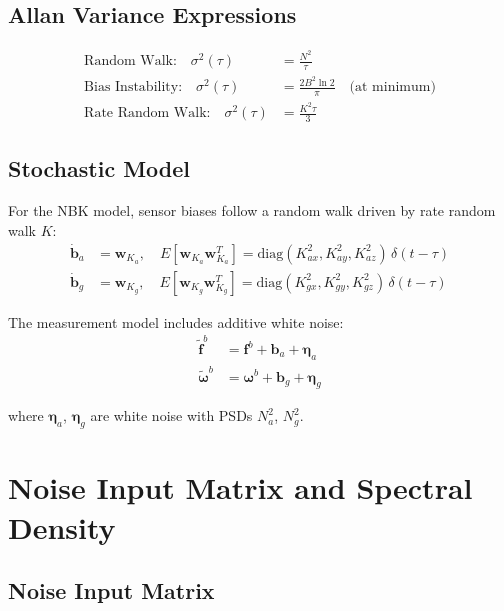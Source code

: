 \documentclass[11pt,a4paper]{article}
\newcommand{\mat}[1]{\mathbf{#1}}
\newcommand{\vect}[1]{\boldsymbol{#1}}
\begin{document}
\subsection{Allan Variance Expressions}

\begin{align}
    \text{Random Walk:} \quad \sigma^2(\tau) &= \frac{N^2}{\tau} \\
    \text{Bias Instability:} \quad \sigma^2(\tau) &= \frac{2B^2 \ln 2}{\pi} \quad \text{(at minimum)} \\
    \text{Rate Random Walk:} \quad \sigma^2(\tau) &= \frac{K^2 \tau}{3}
\end{align}

\subsection{Stochastic Model}

For the NBK model, sensor biases follow a random walk driven by rate random walk $K$:
\begin{align}
    \dot{\mat{b}}_a &= \mat{w}_{K_a}, \quad E[\mat{w}_{K_a}\mat{w}_{K_a}^T] = \text{diag}(K_{ax}^2, K_{ay}^2, K_{az}^2)\,\delta(t-\tau) \\
    \dot{\mat{b}}_g &= \mat{w}_{K_g}, \quad E[\mat{w}_{K_g}\mat{w}_{K_g}^T] = \text{diag}(K_{gx}^2, K_{gy}^2, K_{gz}^2)\,\delta(t-\tau)
\end{align}

The measurement model includes additive white noise:
\begin{align}
    \tilde{\mat{f}}^b &= \mat{f}^b + \mat{b}_a + \vect{\eta}_a \\
    \tilde{\vect{\omega}}^b &= \vect{\omega}^b + \mat{b}_g + \vect{\eta}_g
\end{align}

where $\vect{\eta}_a$, $\vect{\eta}_g$ are white noise with PSDs $N_a^2$, $N_g^2$.

\section{Noise Input Matrix and Spectral Density}

\subsection{Noise Input Matrix}
\end{document}

